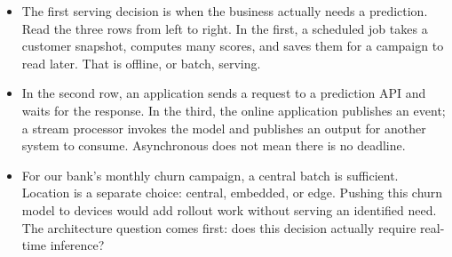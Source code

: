 \documentclass[11pt,a4paper]{article}
\begin{document}
\begin{examplebox}[title after break={SPOKEN SCRIPT --- slide 8 continued}]
\begin{itemize}
\item The first serving decision is when the business actually needs a prediction. Read the three rows from left to right. In the first, a scheduled job takes a customer snapshot, computes many scores, and saves them for a campaign to read later. That is offline, or batch, serving.
\item In the second row, an application sends a request to a prediction API and waits for the response. In the third, the online application publishes an event; a stream processor invokes the model and publishes an output for another system to consume. Asynchronous does not mean there is no deadline.
\item For our bank's monthly churn campaign, a central batch is sufficient. Location is a separate choice: central, embedded, or edge. Pushing this churn model to devices would add rollout work without serving an identified need. The architecture question comes first: does this decision actually require real-time inference?
\end{itemize}
\end{examplebox}
\par\noindent{\scriptsize\textcolor{teal!60!black}{Reading anchor: Kalinowski, §13.3, Fig. 13.2–13.4; supporting Ch. 12 · Nazir et al., §4.3 (I12)}}
\clearpage
\end{document}
